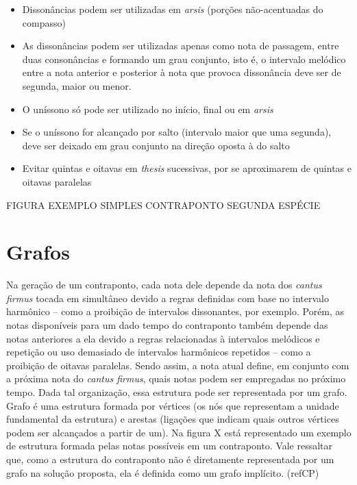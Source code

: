         \begin{itemize}
          \item Dissonâncias podem ser utilizadas em \textit{arsis} (porções não-acentuadas do compasso)
          \item As dissonâncias podem ser utilizadas apenas como nota de passagem, entre duas consonâncias e formando um grau conjunto, isto é, o intervalo melódico entre a nota anterior e posterior à nota que provoca dissonância deve ser de segunda, maior ou menor.
          \item O uníssono só pode ser utilizado no início, final ou em \textit{arsis}
          \item Se o uníssono for alcançado por salto (intervalo maior que uma segunda), deve ser deixado em grau conjunto na direção oposta à do salto
          \item Evitar quintas e oitavas em \textit{thesis} sucessivas, por se aproximarem de quintas e oitavas paralelas
        \end{itemize}

        FIGURA EXEMPLO SIMPLES CONTRAPONTO SEGUNDA ESPÉCIE


  \section[Grafos]{Grafos}

    Na geração de um contraponto, cada nota dele depende da nota dos \textit{cantus firmus} tocada em simultâneo devido a regras definidas com base no intervalo harmônico -- como a proibição de intervalos dissonantes, por exemplo. Porém, as notas disponíveis para um dado tempo do contraponto também depende das notas anteriores a ela devido a regras relacionadas à intervalos melódicos e repetição ou uso demasiado de intervalos harmônicos repetidos -- como a proibição de oitavas paralelas. Sendo assim, a nota atual define, em conjunto com a próxima nota do \textit{cantus firmus}, quais notas podem ser empregadas no próximo tempo. Dada tal organização, essa estrutura pode ser representada por um grafo. Grafo é uma estrutura formada por vértices (os nós que representam a unidade fundamental da estrutura) e arestas (ligações que indicam quais outros vértices podem ser alcançados a partir de um). Na figura X está representado um exemplo de estrutura formada pelas notas possíveis em um contraponto. Vale ressaltar que, como a estrutura do contraponto não é diretamente representada por um grafo na solução proposta, ela é definida como um grafo implícito. (refCP)

